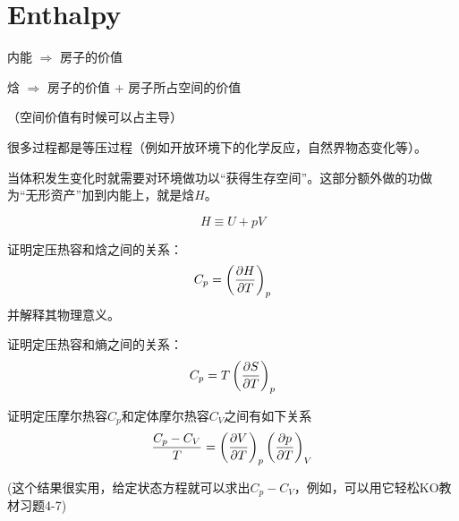 \documentclass[CJK]{beamer}
\begin{document}
\section{Enthalpy}

\begin{frame}
\bch

内能 $\Rightarrow$ 房子的价值

\skipline

焓 $\Rightarrow$ 房子的价值 + 房子所占空间的价值



（空间价值有时候可以占主导）


\ech
\end{frame}

\begin{frame}
\bch


很多过程都是等压过程（例如开放环境下的化学反应，自然界物态变化等）。

\hspace{0.1in}

当体积发生变化时就需要对环境做功以“获得生存空间”。这部分额外做的功做为“无形资产”加到内能上，就是焓$H$。

$$ H  \equiv U + pV$$ 

\ech
\end{frame}



\begin{frame}
\bch
{}

证明定压热容和焓之间的关系：
{\blue
$$ C_p = \left(\frac{\partial H}{\partial T}\right)_{p} $$}
并解释其物理意义。
\ech
\end{frame}

\begin{frame}
\bch
{}

证明定压热容和熵之间的关系：
{\blue
$$ C_p = T\left(\frac{\partial S}{\partial T}\right)_{p} $$
}
\ech
\end{frame}



\begin{frame}
\bch


证明定压摩尔热容$C_p$和定体摩尔热容$C_V$之间有如下关系
{\blue
$$\frac{C_p-C_V}{T} =  \left(\frac{\partial V}{\partial T}\right)_{p} \left(\frac{\partial p}{\partial T}\right)_{V}$$
}

(这个结果很实用，给定状态方程就可以求出$C_p-C_V$，例如，可以用它轻松KO教材习题4-7)
\ech
\end{frame}
\end{document}
